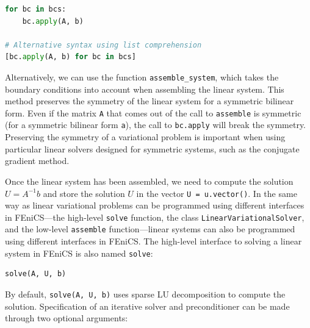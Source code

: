\documentclass[graybox,envcountchap,sectrefs,final]{svmonodo}
\begin{document}
\begin{lstlisting}[language=Python,style=graycolor]
for bc in bcs:
    bc.apply(A, b)

# Alternative syntax using list comprehension
[bc.apply(A, b) for bc in bcs]
\end{lstlisting}


Alternatively, we can use the function \Verb!assemble_system!, which takes
the boundary conditions into account when assembling the linear
system. This method preserves the symmetry of the linear system for a
symmetric bilinear form. Even if the matrix \texttt{A} that comes out
of the call to \texttt{assemble} is symmetric (for a symmetric bilinear form
\texttt{a}), the call to \texttt{bc.apply} will break the symmetry. Preserving the
symmetry of a variational problem is important when using particular
linear solvers designed for symmetric systems, such as the conjugate
gradient method.


Once the linear system has been assembled, we need to compute the
solution $U=A^{-1}b$ and store the solution $U$ in the vector
\texttt{U = u.vector()}. In the same way as linear variational problems can be
programmed using different interfaces in FEniCS---the high-level
\texttt{solve} function, the class \texttt{LinearVariationalSolver}, and the
low-level \texttt{assemble} function---linear systems can also be programmed
using different interfaces in FEniCS. The high-level interface to
solving a linear system in FEniCS is also named \texttt{solve}:

\begin{lstlisting}[language=Python,style=graycolor]
solve(A, U, b)
\end{lstlisting}

By default, \texttt{solve(A, U, b)} uses sparse LU decomposition to compute
the solution. Specification of an iterative solver and preconditioner
can be made through two optional arguments:
\end{document}
